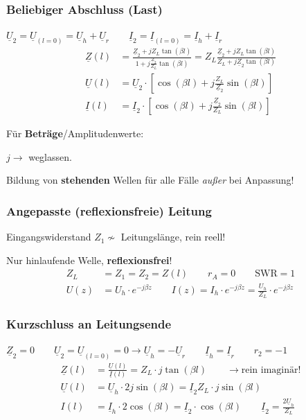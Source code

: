 \subsubsection{Beliebiger Abschluss (Last)} \label{beliebig_abschluss}
$\underline{U}_2 = \underline{U}_{(l=0)} =  \underline{U}_h  +\underline{U}_r \qquad \underline{I}_2 = \underline{I}_{(l=0)} =  \underline{I}_h  +\underline{I}_r $
\begin{align*}
	\underline{Z}(l) & =
	\frac{\underline{Z}_2+jZ_L\tan(\beta
		l)}{1+ j \frac{\underline{Z}_2}{Z_L}\tan(\beta l)}
	= Z_L \frac{\underline{Z}_2 + j Z_L \tan(\beta l)}{Z_L + j \underline{Z}_2 \tan(\beta l)}                              \\
	\underline{U}(l) & = \underline{U}_2 \cdot \left[ \cos(\beta l) + j \tfrac{Z_L}{\underline{Z}_2} \sin(\beta l) \right] \\
	\underline{I}(l) & = \underline{I}_2 \cdot \left[ \cos(\beta l) + j \tfrac{\underline{Z}_2}{Z_L} \sin(\beta l) \right]
\end{align*}

Für \textbf{Beträge}/Amplitudenwerte: \quad {}

$j \rightarrow$ weglassen.

\vspace{1em}
Bildung von \textbf{stehenden} Wellen für alle Fälle \textit{außer} bei Anpassung!

\newpage
\subsubsection{Angepasste (reflexionsfreie) Leitung}
Eingangswiderstand $ Z_1\nsim$ Leitungslänge, rein reell!

Nur hinlaufende Welle, \textbf{reflexionsfrei}!
\begin{align*}
	Z_L  & = Z_1 = Z_2 = Z(l) \qquad
	r_A          =0 \qquad
	\mathrm{SWR} = 1                        \\
	U(z) & = U_h\cdot e ^{-j\beta z}  \qquad
	I(z)         = I_h \cdot e^{-j\beta z} = \frac{U_h}{Z_L}\cdot e^{-j\beta z}
\end{align*}

\subsubsection{Kurzschluss an Leitungsende}
$ \underline{Z}_2 = 0 \qquad \underline{U}_2 = \underline{U}_{(l=0)} = 0 \rightarrow \underline{U}_h = - \underline{U}_r \qquad \underline{I}_h = \underline{I}_r \qquad r_2 = -1$
\begin{align*}
	\underline{Z}(l) & = \frac{\underline{U}(l)}{\underline{I}(l)} =  Z_L\cdot j\tan(\beta l)        \qquad \rightarrow \text{rein imaginär!}            \\
	\underline{U}(l) & =  \underline{U}_h  \cdot 2j\sin(\beta l) = \underline{I}_2 Z_L \cdot j\sin(\beta l)                                              \\
	I(l)             & = \underline{I}_h \cdot 2 \cos(\beta l) =\underline{I}_2 \cdot \cos(\beta l) \qquad \underline{I}_2 =\frac{2\underline{U}_h}{Z_L}
\end{align*}

